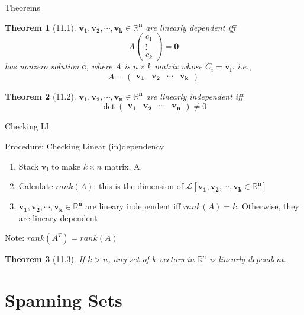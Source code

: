 \documentclass[final]{beamer}
\newtheorem{thm}{Theorem}
\begin{document}
\begin{frame}[t]{Theorems}
	\begin{thm}
		[11.1] $\mathbf{v_1,v_2,\cdots,v_k\in\mathbb{R}^n}$ are linearly dependent iff\[
			A \begin{pmatrix}
				c_1 \\
				\vdots\\
				c_k
			\end{pmatrix} = \mathbf{0}
		\] has nonzero solution $\mathbf{c}$, where $A$ is $n\times k$ matrix whose $C_i = \mathbf{v_i}$. $i.e.,$\[
			A = \begin{pmatrix}
				\mathbf{v_1} & \mathbf{v_2} & \cdots & \mathbf{v_k}
			\end{pmatrix}
		\]
	\end{thm}
	\begin{thm}
		[11.2] $\mathbf{v_1,v_2,\cdots,v_n\in\mathbb{R}^n}$ are linearly independent iff \[
			\det\begin{pmatrix}
				\mathbf{v_1} & \mathbf{v_2} & \cdots & \mathbf{v_n}
			\end{pmatrix} \neq 0
		\]
	\end{thm}

\end{frame}

\begin{frame}[t]{Checking LI}
	\begin{block}
		{Procedure: Checking Linear (in)dependency}
		\begin{enumerate}
			\item Stack $\mathbf{v_i}$ to make $k\times n$ matrix, A. 
			\item Calculate $rank(A)$: this is the dimension of $\mathcal{L}[\mathbf{v_1,v_2,\cdots,v_k\in\mathbb{R}^n}]$
			\item $\mathbf{v_1,v_2,\cdots,v_k\in\mathbb{R}^n}$ are lineary independent iff $rank(A)=k$. Otherwise, they are lineary dependent
		\end{enumerate}
	\end{block}
	Note: $rank(A^T) = rank(A)$
	\begin{thm}
		[11.3] If $k>n$, any set of $k$ vectors in $\mathbb{R}^n$ is linearly dependent.
	\end{thm}
\end{frame}

\section{Spanning Sets} %
\label{sec:spanning_sets}
\end{document}
